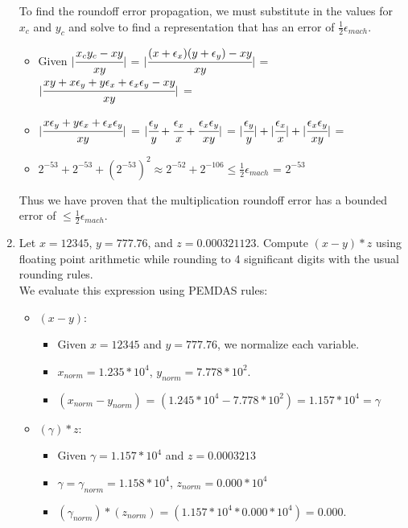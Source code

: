 \documentclass[12pt]{article}
\begin{document}
\begin{enumerate}
	To find the roundoff error propagation, we must substitute in the values for $x_c$ and $y_c$ and solve to find a representation that has an error of $\frac{1}{2} \epsilon_{mach}$.
		\begin{itemize}
			\item[] Given \tabto{1.5cm} $|\cfrac{x_cy_c - xy}{xy}|$ = $|\cfrac{(x + \epsilon_x)(y + \epsilon_y) - xy}{xy}|$ = $|\cfrac{xy + x\epsilon_y + y\epsilon_x + \epsilon_x\epsilon_y - xy}{xy}|$ = \\
			\item[] \tabto{1.5cm} $|\cfrac{x\epsilon_y + y\epsilon_x + \epsilon_x\epsilon_y}{xy}|$ = $|\cfrac{\epsilon_y}{y} + \cfrac{\epsilon_x}{x} + \cfrac{\epsilon_x\epsilon_y}{xy}|$ = $|\cfrac{\epsilon_y}{y}| + |\cfrac{\epsilon_x}{x}| + |\cfrac{\epsilon_x\epsilon_y}{xy}|$ = \\
			\item[] \tabto{1.5cm} $2^{-53} + 2^{-53} + (2^{-53})^2 \approx 2^{-52} + 2^{-106} \leq \frac{1}{2}\epsilon_{mach}$ = $2^{-53}$
		\end{itemize}
		
	Thus we have proven that the multiplication roundoff error has a bounded error of  $\leq \frac{1}{2}\epsilon_{mach}$. \\

	\item Let $x = 12345$, $y = 777.76$, and $z = 0.000321123$. Compute $(x-y)*z$ using floating point arithmetic while rounding to 4 significant digits with the usual rounding rules. \\
	We evaluate this expression using PEMDAS rules:
	\begin{itemize}
		\item[] $(x-y)$: 
			\begin{itemize} 
				\item[] Given $x = 12345$ and $y = 777.76$, we normalize each variable.
				\item[] $x_{norm} = 1.235 * 10^4$, $y_{norm} = 7.778 * 10^2$.
				\item[] $(x_{norm} - y_{norm})$ = $(1.245*10^4 - 7.778*10^2) = 1.157*10^4 = \gamma$		
			\end{itemize}	
		\item[] $(\gamma)*z$:
			\begin{itemize} 
				\item[] Given $\gamma = 1.157*10^4$ and $z = 0.0003213$
				\item[] $\gamma = \gamma_{norm} = 1.158*10^4$, $z_{norm} = 0.000 * 10^4$
				\item[] $(\gamma_{norm}) * (z_{norm}) = (1.157 * 10^4 * 0.000*10^4) = 0.000$.
			\end{itemize}	
	\end{itemize}


\end{enumerate}
\end{document}
